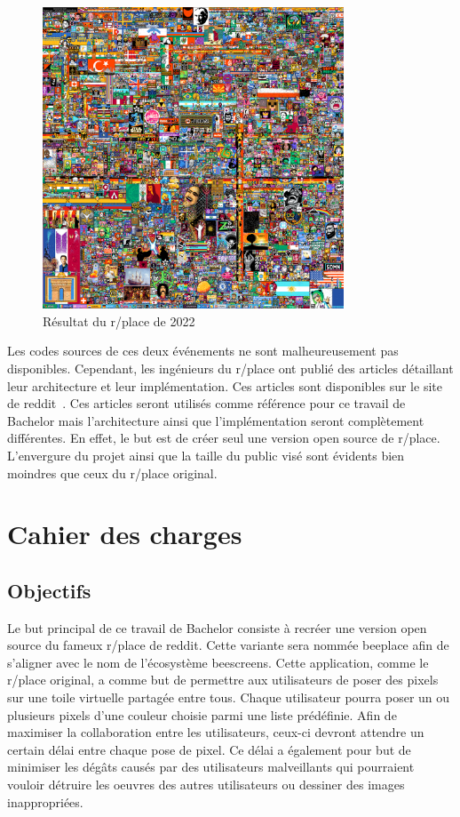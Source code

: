 \begin{figure}[H]
  \centering
  \includegraphics[width=0.8\textwidth]{./assets/figures/rplace.png}
  \caption{Résultat du r/place de 2022}
  \label{fig:rplace2022}
\end{figure}

Les codes sources de ces deux événements ne sont malheureusement pas disponibles. Cependant, les ingénieurs du r/place ont publié des articles détaillant leur architecture et leur implémentation. Ces articles sont disponibles sur le site de \gls{reddit}~\cite{rplace2017, rplace2022}. Ces articles seront utilisés comme référence pour ce travail de Bachelor mais l'architecture ainsi que l'implémentation seront complètement différentes. En effet, le but est de créer seul une version open source de r/place. L'envergure du projet ainsi que la taille du public visé sont évidents bien moindres que ceux du r/place original.

\section{Cahier des charges}

\subsection{Objectifs}

Le but principal de ce travail de Bachelor consiste à recréer une version open source du fameux r/place de \gls{reddit}. Cette variante sera nommée \gls{beeplace} afin de s'aligner avec le nom de l'écosystème \gls{beescreens}.
Cette application, comme le r/place original, a comme but de permettre aux utilisateurs de poser des pixels sur une toile virtuelle partagée entre tous. Chaque utilisateur pourra poser un ou plusieurs pixels d'une couleur choisie parmi une liste prédéfinie. Afin de maximiser la collaboration entre les utilisateurs, ceux-ci devront attendre un certain délai entre chaque pose de pixel. Ce délai a également pour but de minimiser les dégâts causés par des utilisateurs malveillants qui pourraient vouloir détruire les oeuvres des autres utilisateurs ou dessiner des images inappropriées.

